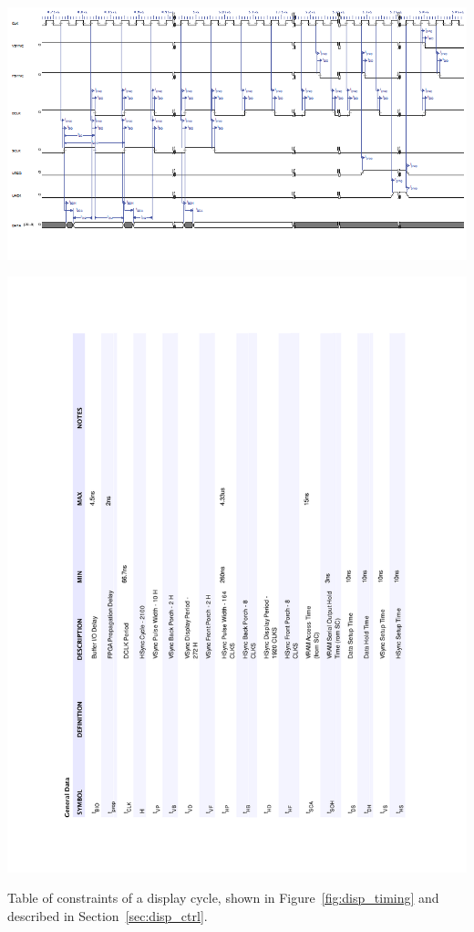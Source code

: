 \documentclass[titlepage]{scrartcl}
\begin{document}
	\clearpage

	\centerline{\includegraphics[width=25cm, angle=90, origin=c]{img/display2.png}}

	\clearpage

	\begin{table}[h!]
	\vspace{-2cm}
	\centerline{\includegraphics[width=20cm]{img/display_table.pdf}}
		\vspace{0cm}
                	\caption{Table of constraints of a display cycle, shown in Figure~\ref{fig:disp_timing} and described in Section~\ref{sec:disp_ctrl}.}
               	\label{tab:disp_timing}
	\end{table}
	
\end{document}
